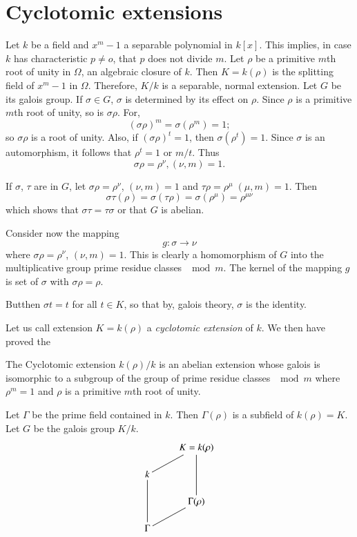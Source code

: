 \section{Cyclotomic extensions}\label{c6:s2}%

Let $k$ be a field and $x^m-1$ a separable polynomial in $k[x]$. This
implies, in case $k$ has characteristic $p \neq o$, that $p$ does not
divide $m$. Let $\rho$ be a primitive $m$th root of unity in $\Omega$,
an algebraic closure of $k$. Then $K = k (\rho)$ is the splitting
field of $x^m - 1$ in $\Omega$. Therefore, $K/k$ is a separable, normal
extension. Let $G$ be its galois group. If $\sigma \in G$,
$\sigma$ is determined by its effect on $\rho$. Since $\rho$ is a
primitive $m$th root of unity, so is $\sigma \rho$. For,  
$$
(\sigma \rho)^m = \sigma (\rho^m) =1 ;
$$
so $\sigma \rho$ is a root of unity. Also, if $(\sigma \rho)^t = 1$,
then $\sigma (\rho^t)= 1$. Since $\sigma$ is an automorphism, it
follows that $\rho^t = 1$ or $m/t$. Thus  
$$
\sigma \rho = \rho^{\nu}, (\nu, m) =1.
$$

If $\sigma$, $\tau$ are in $G$, let $\sigma \rho = \rho^\nu$, $(\nu ,m) = 1$
and $\tau \rho = \rho^\mu \; (\mu, m) =1$. Then 
$$
\sigma \tau (\rho) = \sigma (\tau \rho) = \sigma (\rho^\mu) =
\rho^{\mu \nu} 
$$
which shows that $\sigma \tau = \tau \sigma $ or that $G$ is abelian. 

Consider now the mapping
$$
g : \sigma \to \nu
$$
where $\sigma \rho =\rho^\nu$, $(\nu ,m) =1$. This is clearly a
homomorphism of $G$ into the multiplicative group prime residue classes
$\mod m$. The kernel of the mapping $g$ is set of $\sigma$ with
$\sigma \rho = \rho$. 

But\pageoriginale then $\sigma t = t$ for all $t \in K$, so that by,
galois theory, $\sigma$ is the identity.   

Let us call extension $K = k (\rho)$ a \textit{cyclotomic extension}
of $k$. We then have proved the  

\begin{thm}\label{c6:thm2} %
The Cyclotomic extension $k(\rho) / k  $ is an abelian extension whose
galois is isomorphic to a subgroup of the group of prime residue
classes $\mod m$ where $\rho^m = 1 $ and $\rho$ is a primitive $m$th
root of unity.  
\end{thm}

Let $\Gamma$ be the prime field contained in $k$. Then $\Gamma (\rho)$
is a subfield of $k(\rho)  = K$. Let $G$ be the galois group
$K/k$. 
\[
\xymatrix@R=0.5cm{
& K=k(\rho) \ar@{-}[dl] \ar@{-}[dd]\\
k\ar@{-}[dd] & \\
& \Gamma (\rho) \ar@{-}[dl] \\
\Gamma  & 
}
\]

